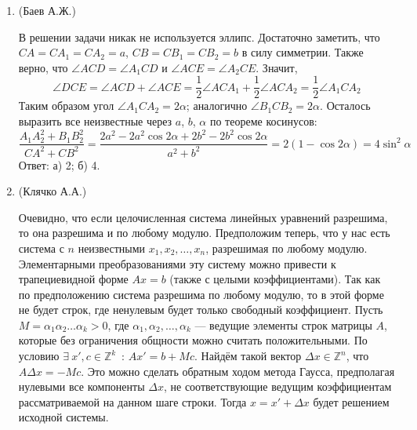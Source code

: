 \documentclass[11pt, a4paper]{article}
\begin{document}
\begin{enumerate}
\newpage

\item (Баев А.Ж.) 

\begin{center}
    
\end{center}

В решении задачи никак не используется эллипс. Достаточно заметить, что $CA = CA_1 = CA_2 = a$, $CB = CB_1 = CB_2 = b$ в силу симметрии. Также верно, что $\angle ACD = \angle A_1CD$ и $\angle ACE = \angle A_2CE$. Значит, 
$$\angle DCE = \angle ACD  + \angle ACE = \frac12 \angle ACA_1 + \frac12 \angle ACA_2 = \frac12 \angle A_1CA_2$$
Таким образом угол $\angle A_1CA_2 = 2 \alpha$; аналогично $\angle B_1CB_2 = 2 \alpha$.  Осталось выразить все неизвестные через $a$, $b$, $\alpha$ по теореме косинусов:
$$
\frac{ A_1A_2^2 + B_1B_2^2 }{CA^2 + CB^2}
=
\frac{ 2 a^2 - 2 a^2 \cos{2 \alpha} + 2 b^2 - 2 b^2 \cos{2 \alpha} }{a^2 + b^2}
=
2 (1 - \cos{2 \alpha})
=
4 \sin^2 \alpha 
$$
Ответ: а) 2; б) 4.

\newpage

\item (Клячко А.А.) 

Очевидно, что если целочисленная система линейных уравнений разрешима, то она разрешима и по любому модулю. Предположим теперь, что у нас есть система с $n$ неизвестными $x_1, x_2, \hdots, x_n$, разрешимая по любому модулю. Элементарными преобразованиями эту систему можно привести к трапециевидной форме $Ax=b$ (также с целыми коэффициентами). Так как по предположению система разрешима по любому модулю, то в этой форме не будет строк, где ненулевым будет только свободный коэффициент. Пусть $M=\alpha_1\alpha_2\hdots\alpha_k>0$, где $\alpha_1, \alpha_2, \hdots, \alpha_k$ --- ведущие элементы строк матрицы $A$, которые без ограничения общности можно считать положительными. По условию $\exists~ x', c\in\mathbb{Z}^k$~: $Ax'=b+Mc$. Найдём такой вектор $\Delta x\in\mathbb{Z}^n$, что $A\Delta x=-Mc$. Это можно сделать обратным ходом метода Гаусса, предполагая нулевыми все компоненты $\Delta x$, не соответствующие ведущим коэффициентам рассматриваемой на данном шаге строки. Тогда $x=x'+\Delta x$ будет решением исходной системы.

\end{enumerate}
\end{document}
